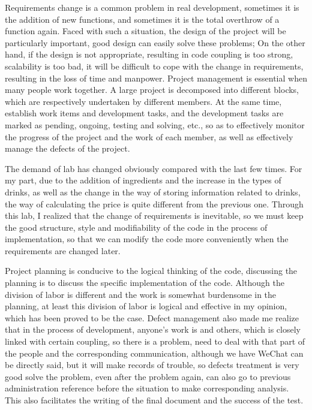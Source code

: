 \documentclass[a4paper]{report}
\begin{document}
\par

Requirements change is a common problem in real development, sometimes it is the addition of new functions, and sometimes it is the total overthrow of a function again. Faced with such a situation, the design of the project will be particularly important, good design can easily solve these problems; On the other hand, if the design is not appropriate, resulting in code coupling is too strong, scalability is too bad, it will be difficult to cope with the change in requirements, resulting in the loss of time and manpower. Project management is essential when many people work together. A large project is decomposed into different blocks, which are respectively undertaken by different members. At the same time, establish work items and development tasks, and the development tasks are marked as pending, ongoing, testing and solving, etc., so as to effectively monitor the progress of the project and the work of each member, as well as effectively manage the defects of the project.


\par


The demand of lab has changed obviously compared with the last few times. For my part, due to the addition of ingredients and the increase in the types of drinks, as well as the change in the way of storing information related to drinks, the way of calculating the price is quite different from the previous one. Through this lab, I realized that the change of requirements is inevitable, so we must keep the good structure, style and modifiability of the code in the process of implementation, so that we can modify the code more conveniently when the requirements are changed later.

\par

Project planning is conducive to the logical thinking of the code, discussing the planning is to discuss the specific implementation of the code. Although the division of labor is different and the work is somewhat burdensome in the planning, at least this division of labor is logical and effective in my opinion, which has been proved to be the case. Defect management also made me realize that in the process of development, anyone's work is and others, which is closely linked with certain coupling, so there is a problem, need to deal with that part of the people and the corresponding communication, although we have WeChat can be directly said, but it will make records of trouble, so defects treatment is very good solve the problem, even after the problem again, can also go to previous administration reference before the situation to make corresponding analysis. This also facilitates the writing of the final document and the success of the test.
\end{document}
